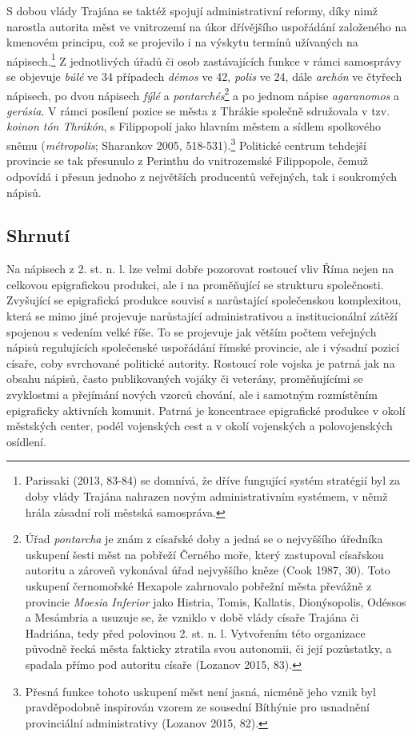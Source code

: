 S dobou vlády Trajána se taktéž spojují administrativní reformy, díky nimž narostla autorita měst ve vnitrozemí na úkor dřívějšího uspořádání založeného na kmenovém principu, což se projevilo i na výskytu termínů užívaných na nápisech.\footnote{Parissaki (2013, 83-84) se domnívá, že dříve fungující systém stratégií byl za doby vlády Trajána nahrazen novým administrativním systémem, v němž hrála zásadní roli městská samospráva.} Z jednotlivých úřadů či osob zastávajících funkce v rámci samosprávy se objevuje {\em búlé} ve 34 případech {\em démos} ve 42, {\em polis} ve 24, dále {\em archón} ve čtyřech nápisech, po dvou nápisech {\em fýlé} a {\em pontarchés}\footnote{Úřad {\em pontarcha} je znám z císařské doby a jedná se o nejvyššího úředníka uskupení šesti měst na pobřeží Černého moře, který zastupoval císařskou autoritu a zároveň vykonával úřad nejvyššího kněze (Cook 1987, 30). Toto uskupení černomořské Hexapole zahrnovalo pobřežní města převážně z provincie {\em Moesia Inferior} jako Histria, Tomis, Kallatis, Dionýsopolis, Odéssos a Mesámbria a usuzuje se, že vzniklo v době vlády císaře Trajána či Hadriána, tedy před polovinou 2. st. n. l. Vytvořením této organizace původně řecká města fakticky ztratila svou autonomii, či její pozůstatky, a spadala přímo pod autoritu císaře (Lozanov 2015, 83).} a po jednom nápise {\em agaranomos} a {\em gerúsia}. V rámci posílení pozice se města z Thrákie společně sdružovala v tzv. {\em koinon tón Thrákón}, s Filippopolí jako hlavním městem a sídlem spolkového sněmu ({\em métropolis}; Sharankov 2005, 518-531).\footnote{Přesná funkce tohoto uskupení měst není jasná, nicméně jeho vznik byl pravděpodobně inspirován vzorem ze sousední Bíthýnie pro usnadnění provinciální administrativy (Lozanov 2015, 82).} Politické centrum tehdejší provincie se tak přesunulo z Perinthu do vnitrozemské Filippopole, čemuž odpovídá i přesun jednoho z největších producentů veřejných, tak i soukromých nápisů.

\subsection[shrnutí-17]{Shrnutí}

Na nápisech z 2. st. n. l. lze velmi dobře pozorovat rostoucí vliv Říma nejen na celkovou epigrafickou produkci, ale i na proměňující se strukturu společnosti. Zvyšující se epigrafická produkce souvisí s narůstající společenskou komplexitou, která se mimo jiné projevuje narůstající administrativou a institucionální zátěží spojenou s vedením velké říše. To se projevuje jak větším počtem veřejných nápisů regulujících společenské uspořádání římské provincie, ale i výsadní pozicí císaře, coby svrchované politické autority. Rostoucí role vojska je patrná jak na obsahu nápisů, často publikovaných vojáky či veterány, proměňujícími se zvyklostmi a přejímání nových vzorců chování, ale i samotným rozmístěním epigraficky aktivních komunit. Patrná je koncentrace epigrafické produkce v okolí městských center, podél vojenských cest a v okolí vojenských a polovojenských osídlení.

